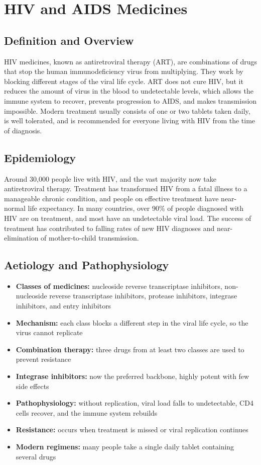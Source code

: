 \chapter{HIV and AIDS Medicines}

\section*{Definition and Overview}
HIV medicines, known as antiretroviral therapy (ART), are combinations of drugs that stop the human immunodeficiency virus from multiplying. They work by blocking different stages of the viral life cycle. ART does not cure HIV, but it reduces the amount of virus in the blood to undetectable levels, which allows the immune system to recover, prevents progression to AIDS, and makes transmission impossible. Modern treatment usually consists of one or two tablets taken daily, is well tolerated, and is recommended for everyone living with HIV from the time of diagnosis.

\section*{Epidemiology}
Around 30,000 people live with HIV, and the vast majority now take antiretroviral therapy. Treatment has transformed HIV from a fatal illness to a manageable chronic condition, and people on effective treatment have near-normal life expectancy. In many countries, over 90\% of people diagnosed with HIV are on treatment, and most have an undetectable viral load. The success of treatment has contributed to falling rates of new HIV diagnoses and near-elimination of mother-to-child transmission.

\section*{Aetiology and Pathophysiology}
\begin{itemize}
    \item \textbf{Classes of medicines:} nucleoside reverse transcriptase inhibitors, non-nucleoside reverse transcriptase inhibitors, protease inhibitors, integrase inhibitors, and entry inhibitors
    \item \textbf{Mechanism:} each class blocks a different step in the viral life cycle, so the virus cannot replicate
    \item \textbf{Combination therapy:} three drugs from at least two classes are used to prevent resistance
    \item \textbf{Integrase inhibitors:} now the preferred backbone, highly potent with few side effects
    \item \textbf{Pathophysiology:} without replication, viral load falls to undetectable, CD4 cells recover, and the immune system rebuilds
    \item \textbf{Resistance:} occurs when treatment is missed or viral replication continues
    \item \textbf{Modern regimens:} many people take a single daily tablet containing several drugs
\end{itemize}

